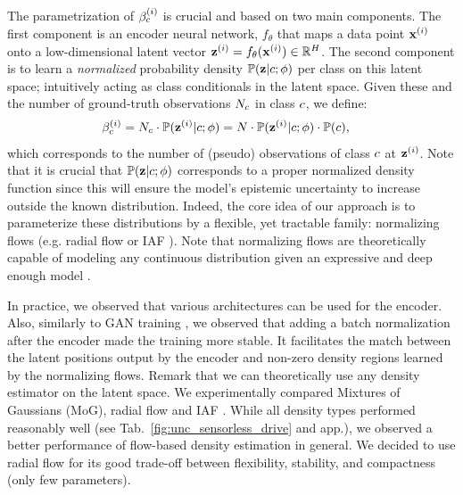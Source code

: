 The parametrization of $\beta_c^{(i)}$ is crucial and based on two main components. The first component is an encoder neural network, $f_{\theta}$ that maps a data point $\mathbf{x}^{(i)}$ onto a low-dimensional latent vector $\bold{z}^{(i)}=f_{\theta}(\mathbf{x}^{(i)}) \in \mathbb{R}^{H}$. The second component is to learn a \textit{normalized} probability density $\mathbb{P}(\bold{z} | c; \phi)$ per class on this latent space; intuitively acting as class conditionals in the latent space. Given these and the number of ground-truth observations $N_c$ in class  $c$, we define:
\begin{equation}
\begin{aligned}
\label{eq:additional_observations}
	\beta_c^{(i)} &= N_c \cdot \mathbb{P}(\bold{z}^{(i)} | c; \phi) = N \cdot \mathbb{P}(\bold{z}^{(i)} | c; \phi) \cdot \mathbb{P}(c),
\end{aligned}
\end{equation}
which corresponds to the number of (pseudo) observations of class $c$ at $\bold{z} ^{(i)}$. Note that it is crucial that $\mathbb{P}(\bold{z} | c; \phi)$ corresponds to a proper normalized density function since this will ensure the model's epistemic uncertainty to increase outside the known distribution. Indeed, the core idea of our approach is to parameterize these distributions by a flexible, yet tractable family: normalizing flows (e.g. radial flow \cite{vi_flow} or IAF \cite{iaf_flow}). Note that normalizing flows are theoretically capable of modeling any continuous distribution given an expressive and deep enough model \cite{neural_flow, iaf_flow}.

In practice, we observed that various architectures can be used for the encoder. Also, similarly to GAN training \cite{GAN_batch_norm}, we observed that adding a batch normalization after the encoder made the training more stable. It facilitates the match between the latent positions output by the encoder and non-zero density regions learned by the normalizing flows. Remark that we can theoretically use any density estimator on the latent space. We experimentally compared Mixtures of Gaussians (MoG), radial flow \cite{vi_flow} and IAF \cite{iaf_flow}. While all density types performed reasonably well (see Tab.~\ref{fig:unc_sensorless_drive} and app.), we observed a better performance of flow-based density estimation in general. We decided to use radial flow for its good trade-off between flexibility, stability, and compactness (only few parameters).

